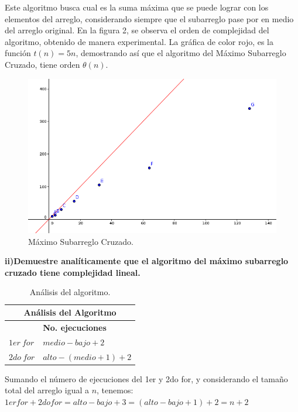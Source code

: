 \documentclass[12pt]{report}
\begin{document}
	Este algoritmo busca cual es la suma máxima que se puede lograr con los elementos del arreglo, considerando siempre que el subarreglo pase por en medio del arreglo original. En la figura 2, se observa el orden de complejidad del algoritmo, obtenido de manera experimental. La gráfica de color rojo, es la función $t(n)=5n$, demostrando así que el algoritmo del Máximo Subarreglo Cruzado, tiene orden $\theta (n)$.\newpage

	\begin{figure}[H]
		\includegraphics[width=12cm]{imagenes/2.png}
		\centering
		\caption{Máximo Subarreglo Cruzado.}
		\centering
	\end{figure}

	\textbf{ii)Demuestre analíticamente que el algoritmo del máximo subarreglo cruzado tiene complejidad lineal.}\newline
	
	\begin{table}[htbp]
		\begin{center}
			\begin{tabular}{|l|l|}
				\hline
				\multicolumn{2}{|c|}{Análisis del Algoritmo} \\ 
				\hline
				\textbf{} & \textbf{No. ejecuciones}\\
				\hline
				$1er \ for$ & $medio - bajo + 2$ \\ \hline
				$2do \ for$ & $alto -(medio + 1)+2$ \\ \hline			
			\end{tabular}
			\caption{Análisis del algoritmo.}
			\label{tabla:analisis1}
		\end{center}
	\end{table}
	Sumando el número de ejecuciones del 1er y 2do for, y considerando el tamaño total del arreglo igual a $n$, tenemos: \\
	$1er for + 2do for = alto - bajo +3= (alto - bajo + 1)+2= n + 2$\\
	
\end{document}
